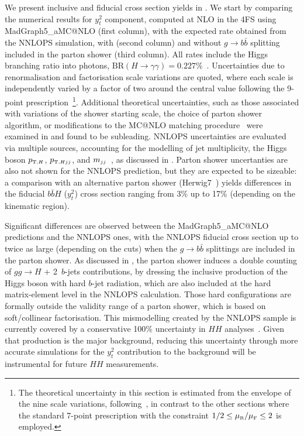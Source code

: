 \documentclass[11pt,a4paper]{article}
\begin{document}
We present inclusive and fiducial cross section yields in .
We start by comparing the numerical results for \bbH{} $y_t^2$ component, computed at NLO in the 4FS using {\sc MadGraph5\_aMC@NLO} (first column), with the 
expected rate obtained from the {\sc NNLOPS} simulation, with (second column) and without $g\rightarrow b\bar{b}$ splitting included in the parton shower (third column). 
All rates include the Higgs branching ratio into photons, $\textrm{BR}(H \to \gamma\gamma) = 0.227\%$~\cite{LHCHiggsCrossSectionWorkingGroup:2016ypw}. 
Uncertainties due to renormalisation and factorisation scale variations are quoted, where each scale is independently varied by a factor of two around the 
central value following the 9-point prescription~\footnote{The theoretical uncertainty in this section is estimated from the envelope of the nine scale variations, following~, in contrast to the other sections where the standard 7-point prescription with the constraint $1/2 \leq \muR/\muF \leq 2$ is employed.}. Additional theoretical uncertainties, such as those associated with variations of the shower starting scale, 
the choice of parton shower algorithm, or modifications to the MC@NLO matching procedure~\cite{frixione:2002ik,frederix:2020trv} were examined 
in  and found to be subleading. 
{\sc NNLOPS} uncertainties are evaluated via multiple sources, accounting for the modelling of jet multiplicity, the Higgs boson $\ptH$, $\ptHjj$, and $\mjj$~\cite{LHCHiggsCrossSectionWorkingGroup:2016ypw,Liu:2013hba,stewart:2013faa,Boughezal:2013oha,Stewart:2011cf,Gangal:2013nxa}, as discussed in . Parton shower uncertanties are also not shown for the {\sc NNLOPS} prediction, but they are expected to be sizeable: a comparison with an alternative parton shower ({\sc Herwig7}~\cite{Bellm:2015jjp}) yields differences in the fiducial $b\bar{b}H$ ($y_t^2$) cross section ranging from 3\% up to 17\% (depending on the kinematic region).


Significant differences are observed between the {\sc MadGraph5\_aMC@NLO} predictions and 
the {\sc NNLOPS} ones, with the {\sc NNLOPS} fiducial cross section up to twice as large (depending
on the cuts) when the $g\rightarrow b\bar{b}$ splittings are included in the parton shower. 
As discussed in , the parton shower induces a double counting of 
$gg\to H$ + 2~$b$-jets contributions, by dressing the inclusive production of the Higgs boson with hard $b$-jet
radiation, which are also included at the hard matrix-element level in the {\sc NNLOPS} calculation. 
Those hard configurations are formally outside the validity range of a parton shower, which is based on soft/collinear
factorisation. This mismodelling created by the {\sc NNLOPS} sample is currently covered by a 
conservative 100\% uncertainty in $HH$ analyses~\cite{HDBS-2021-10,ATLAS:2025hhd}. Given
that \bbH{} production is the major background, reducing this uncertainty through more
accurate simulations for the $y_t^2$ contribution to the \bbH{} background will be 
instrumental for future $HH$ measurements.
\end{document}
